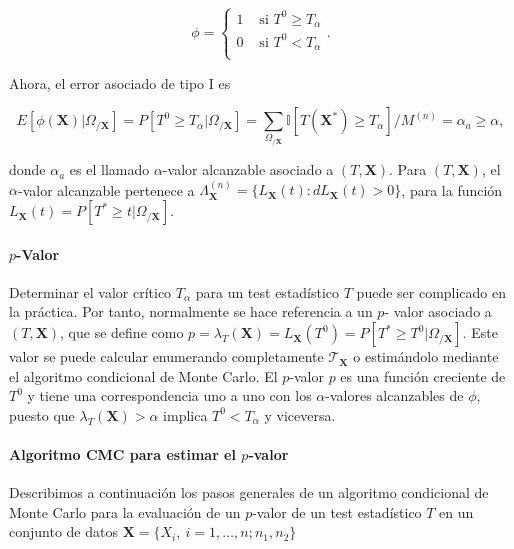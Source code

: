 	\[ 
		\phi = \left\lbrace \begin{array}{cc}
			1 		& \text{ si } T^0 \geq T_\alpha \\
			0		& \text{ si } T^0 < T_\alpha \\
		\end{array} \right. .
	\]
	
	Ahora, el error asociado de tipo I es 
	
	\[ 
		E[ \phi(\mathbf{X}) | \Omega_{/\mathbf{X}}] =
		P[ T^0 \geq T_\alpha | \Omega_{/\mathbf{X}}] =
		\sum\limits_{\Omega_{/\mathbf{X}}}
			\mathbb{I}[ T(\mathbf{X}^*) \geq T_\alpha ]/
				M^{(n)} =
		\alpha_a \geq
		\alpha,
	\] 
	
	donde $\alpha_a$ es el llamado $\alpha$-valor alcanzable 
asociado a $(T, \mathbf{X})$. Para $(T,\mathbf{X})$, el 
$\alpha$-valor alcanzable pertenece a $\Lambda_\mathbf{X}
^{(n)} = \{ L_\mathbf{X}(t): dL_\mathbf{X}(t) > 0 \}$, para 
la función $ L_\mathbf{X}(t) = P[ T^* \geq t | \Omega_{/
\mathbf{X}}] $. 
	
\paragraph{$p$-Valor} Determinar el valor crítico $T_\alpha$ 
para un test estadístico $T$ puede ser complicado en la 
práctica. Por tanto, normalmente se hace referencia a un $p$-
valor asociado a $(T, \mathbf{X})$, que se define como $p = 
\lambda_T(\mathbf{X}) = L_\mathbf{X}(T^0) = P[ T^* \geq T^0 | 
\Omega_{/\mathbf{X}}]$. Este valor se puede calcular 
enumerando completamente $\mathcal{T}_\mathbf{X}$ o 
estimándolo mediante el algoritmo condicional de Monte Carlo. 
El $p$-valor $p$ es una función creciente de $T^0$ y tiene 
una  correspondencia uno a uno con los $\alpha$-valores 
alcanzables de $\phi$, puesto que $\lambda_T(\mathbf{X}) > 
\alpha$ implica $T^0 < T_\alpha$ y viceversa.

\paragraph{Algoritmo CMC para estimar el $p$-valor}  
Describimos a continuación los pasos generales de un 
algoritmo condicional de Monte Carlo para la evaluación de un 
$p$-valor de un test estadístico $T$ en un conjunto de datos 
$\mathbf{X} = \{ X_i, \ i=1, \dots, n; n_1, n_2 \}$

